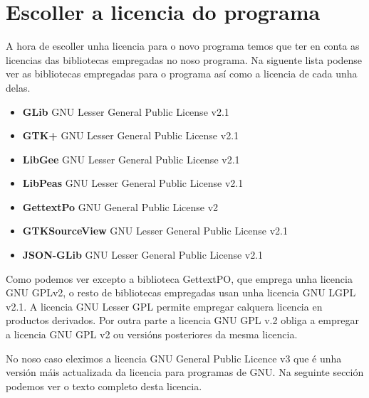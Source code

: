 \chapter{Escoller a licencia do programa}

A hora de escoller unha licencia para o novo programa temos que ter en conta as licencias das bibliotecas empregadas no noso programa. Na siguente lista podense ver as bibliotecas empregadas para o programa así como a licencia de cada unha delas.

\begin{itemize}
  \item \textbf{GLib} GNU Lesser General Public License v2.1
  \item \textbf{GTK+} GNU Lesser General Public License v2.1
  \item \textbf{LibGee}  GNU Lesser General Public License v2.1
  \item \textbf{LibPeas} GNU Lesser General Public License v2.1
  \item \textbf{GettextPo} GNU General Public License v2
  \item \textbf{GTKSourceView} GNU Lesser General Public License v2.1
  \item \textbf{JSON-GLib} GNU Lesser General Public License v2.1
\end{itemize}

Como podemos ver excepto a biblioteca GettextPO, que emprega unha licencia GNU GPLv2, o resto de bibliotecas empregadas usan unha licencia GNU LGPL v2.1. A licencia GNU Lesser GPL permite empregar calquera licencia en productos derivados. Por outra parte a licencia GNU GPL v.2 obliga a empregar a licencia GNU GPL v2 ou versións posteriores da mesma licencia.

No noso caso eleximos a licencia GNU General Public Licence v3 que é unha versión máis actualizada da licencia para programas de GNU. Na seguinte sección podemos ver o texto completo desta licencia.
